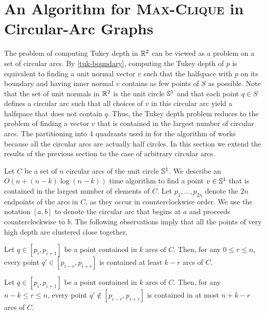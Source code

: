 \documentclass[charterfonts,lotsofwhite]{patmorin}
\begin{document}
\section{An Algorithm for \textsc{Max-Clique} in Circular-Arc Graphs}

The problem of computing Tukey depth in $\mathbb{R}^2$ can be viewed as a
problem on a set of circular arcs.  By \eqref{tuk-boundary}, computing
the Tukey depth of $p$ is equivalent to finding a unit normal vector
$v$ such that the halfspace with $p$ on its boundary and having inner
normal $v$ contains as few points of $S$ as possible.
Note that the set of unit normals in $\mathbb{R}^2$ is the unit circle $\mathbb{S}^1$
and that each point $q\in S$ defines a circular arc such that all
choices of $v$ in this circular arc yield a halfspace that does not
contain $q$.  Thus, the Tukey depth problem reduces to the problem of
finding a vector $v$ that is contained in the largest number of
circular arcs. The partitioning into 4 quadrants used in for the
algorithm of  works because all the circular arcs are
actually half circles.  In this section we extend the results of the
previous section to the case of arbitrary circular arcs.

Let $C$ be a set of $n$ circular arcs of the unit circle $\mathbb{S}^1$.  We
describe an $O(n+(n-k)\log (n-k))$ time algorithm to find a point
$v\in\mathbb{S}^1$ that is contained in the largest number of elements of
$C$.  Let $p_1,\ldots,p_{2n}$ denote the $2n$ endpoints of the arcs in
$C$, as they occur in counterclockwise order.  We use the notation
$[a,b]$ to denote the circular arc that begins at $a$ and proceeds
counterclockwise to $b$.  The following observations imply that all
the points of very high depth are clustered close together.

\begin{obs}
Let $q\in[p_i,p_{i+1}]$ be a point contained in $k$ arcs of $C$.
Then, for any $0\le r\le n$, every point $q'\in[p_{i-r},p_{i+r}]$ is
contained at least $k-r$ arcs of $C$.
\end{obs}

\begin{obs}
Let $q\in[p_i,p_{i+1}]$ be a point contained in $k$ arcs of $C$.
Then, for any $n-k \le r\le n$, every point $q'\notin[p_{i-r},p_{i+r}]$ 
is contained in at most $n+k-r$ arcs of $C$.
\end{obs}
\end{document}
